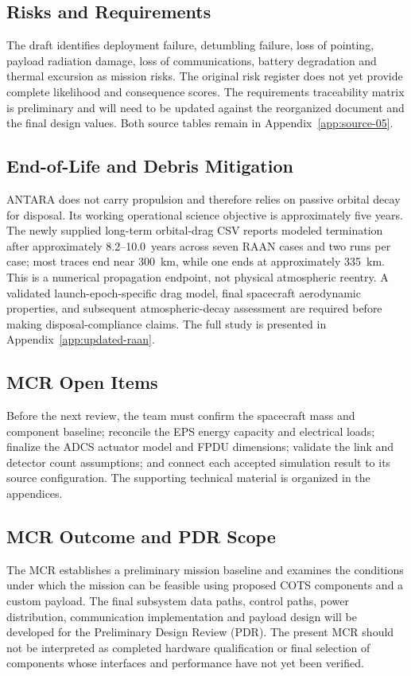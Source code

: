 \subsection{Risks and Requirements}\label{risk-method-and-register}
The draft identifies deployment failure, detumbling failure, loss of pointing, payload radiation damage, loss of communications, battery degradation and thermal excursion as mission risks. The original risk register does not yet provide complete likelihood and consequence scores. The requirements traceability matrix is preliminary and will need to be updated against the reorganized document and the final design values. Both source tables remain in Appendix~\ref{app:source-05}.

\subsection{End-of-Life and Debris Mitigation}\label{end-of-life-deorbit-and-debris-mitigation-compliance}
ANTARA does not carry propulsion and therefore relies on passive orbital decay for disposal. Its working operational science objective is approximately five years. The newly supplied long-term orbital-drag CSV reports modeled termination after approximately 8.2--10.0~years across seven RAAN cases and two runs per case; most traces end near 300~km, while one ends at approximately 335~km. This is a numerical propagation endpoint, not physical atmospheric reentry. A validated launch-epoch-specific drag model, final spacecraft aerodynamic properties, and subsequent atmospheric-decay assessment are required before making disposal-compliance claims. The full study is presented in Appendix~\ref{app:updated-raan}.

\subsection{MCR Open Items}\label{sec:open-issues}
Before the next review, the team must confirm the spacecraft mass and component baseline; reconcile the EPS energy capacity and electrical loads; finalize the ADCS actuator model and FPDU dimensions; validate the link and detector count assumptions; and connect each accepted simulation result to its source configuration. The supporting technical material is organized in the appendices.

\subsection{MCR Outcome and PDR Scope}\label{sec:mcr-pdr-scope}
The MCR establishes a preliminary mission baseline and examines the conditions under which the mission can be feasible using proposed COTS components and a custom payload. The final subsystem data paths, control paths, power distribution, communication implementation and payload design will be developed for the Preliminary Design Review (PDR). The present MCR should not be interpreted as completed hardware qualification or final selection of components whose interfaces and performance have not yet been verified.

